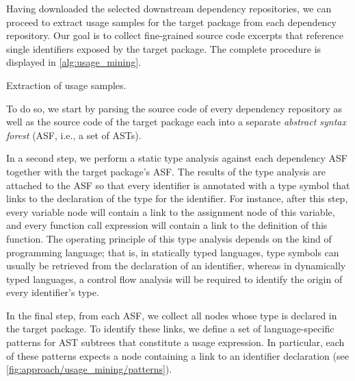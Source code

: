 Having downloaded the selected downstream dependency repositories, we can proceed to extract usage samples for the target package from each dependency repository.
Our goal is to collect fine-grained source code excerpts that reference single identifiers exposed by the target package.
The complete procedure is displayed in \cref{alg:usage_mining}.

\begin{algorithm}[b]
	\caption{Extraction of usage samples.}\label{alg:usage_mining}

	\;
\end{algorithm}

To do so, we start by parsing the source code of every dependency repository as well as the source code of the target package each into a separate \emph{abstract syntax forest} (ASF, i.e., a set of ASTs).

In a second step, we perform a static type analysis against each dependency ASF together with the target package's ASF.
The results of the type analysis are attached to the ASF so that every identifier is annotated with a type symbol that links to the declaration of the type for the identifier.
For instance, after this step, every variable node will contain a link to the assignment node of this variable, and every function call expression will contain a link to the definition of this function.
The operating principle of this type analysis depends on the kind of programming language; that is, in statically typed languages, type symbols can usually be retrieved from the declaration of an identifier, whereas in dynamically typed languages, a control flow analysis will be required to identify the origin of every identifier's type.

In the final step, from each ASF, we collect all nodes whose type is declared in the target package.
To identify these links, we define a set of language-specific patterns for AST subtrees that constitute a usage expression.
In particular, each of these patterns expects a node containing a link to an identifier declaration (see \cref{fig:approach/usage_mining/patterns}).
